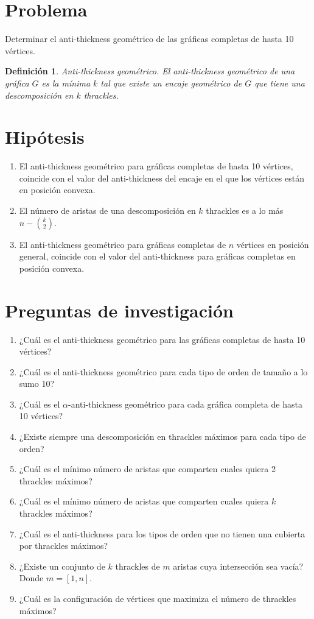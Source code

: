 \documentclass[12pt, letterpaper]{article}
\newtheorem{definition}{Definición}[section]
\begin{document}
\section{Problema}
Determinar el anti-thickness geométrico de las gráficas completas de hasta 10 vértices.

\begin{definition}{Anti-thickness geométrico.}
El anti-thickness geométrico de una gráfica $G$ es la mínima $k$ tal que existe un encaje geométrico de $G$ que tiene una descomposición en $k$ thrackles.
\end{definition}
\section{Hipótesis}
\begin{enumerate}
  \item El anti-thickness geométrico para gráficas completas de hasta 10
   vértices, coincide con el valor del anti-thickness del encaje en el que
   los vértices están en posición convexa.
  \item El número de aristas de una descomposición en $k$ thrackles es a lo más
  $n - \binom{k}{2}$.
  \item El anti-thickness geométrico para gráficas completas de $n$ vértices
  en posición general,  coincide con el valor del anti-thickness
  para gráficas completas en posición convexa.
\end{enumerate}
\section{Preguntas de investigación}
\begin{enumerate}
  \item ¿Cuál  es el anti-thickness geométrico para las gráficas completas
  de hasta 10 vértices?
  \item ¿Cuál es el anti-thickness geométrico para cada tipo de orden de
  tamaño a lo sumo 10?
  \item ¿Cuál es el $\alpha$-anti-thickness geométrico para cada gráfica
  completa de hasta 10 vértices?
  \item ¿Existe siempre una descomposición en thrackles máximos para cada tipo
  de orden?
  \item ¿Cuál es el mínimo número de aristas que comparten cuales quiera 2
  thrackles máximos?
  \item ¿Cuál  es el mínimo número de aristas que comparten cuales quiera $k$
  thrackles máximos?
  \item ¿Cuál es el anti-thickness para los tipos de orden que no tienen una
  cubierta por thrackles máximos?
  \item ¿Existe un conjunto de $k$ thrackles de $m$ aristas cuya intersección
  sea vacía? Donde $m =[1,n]$.
  \item ¿Cuál es la configuración de vértices que maximiza el número
  de thrackles máximos?
\end{enumerate}
\end{document}
